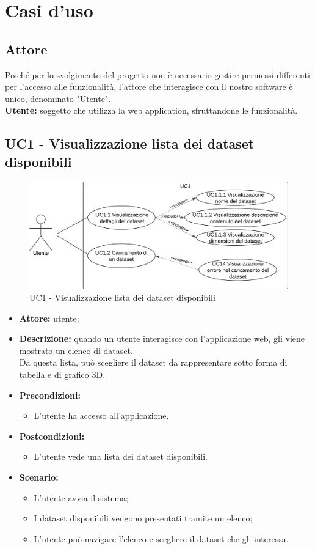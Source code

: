 \section{Casi d'uso}
\subsection{Attore}
Poiché per lo svolgimento del progetto non è necessario gestire permessi differenti per l'accesso alle funzionalità, l'attore che interagisce con il nostro software è unico, denominato "Utente".\\
\textbf{Utente:} soggetto che utilizza la web application, sfruttandone le funzionalità.
\subsection{UC1 - Visualizzazione lista dei dataset disponibili}
\begin{figure}[h!]
    \centering
    \includegraphics[scale=0.7]{template/images/UC1.png}
    \caption{UC1 - Visualizzazione lista dei dataset disponibili}
\end{figure}
\begin{itemize}
    \item \textbf{Attore:} utente;
    \item \textbf{Descrizione:} quando un utente interagisce con l'applicazione web,
    gli viene mostrato un elenco di dataset.\\ Da questa lista, può scegliere il dataset da rappresentare sotto forma di tabella e di grafico 3D.
    \item \textbf{Precondizioni:}
    \begin{itemize}
        \item L'utente ha accesso all'applicazione.
    \end{itemize}
    \item \textbf{Postcondizioni:}
    \begin{itemize}
        \item L'utente vede una lista dei dataset disponibili.
    \end{itemize}
    \item \textbf{Scenario:} 
    \begin{itemize}
        \item L'utente avvia il sistema;
        \item I dataset disponibili vengono presentati tramite un elenco;
        \item L'utente può navigare l'elenco e scegliere il dataset che gli interessa.
    \end{itemize}
\end{itemize}
\newpage
